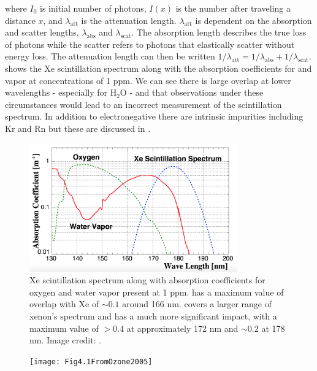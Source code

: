 where $I_0$ is initial number of photons, $I(x)$ is the number after traveling a distance $x$, and $\lambda_{\mathrm{att}}$ is the
attenuation length.  $\lambda_{\mathrm{att}}$ is dependent on the absorption and scatter lengths, $\lambda_{\mathrm{abs}}$ and
$\lambda_{\mathrm{scat}}$.  The absorption length describes the true loss of photons while the scatter refers to photons that elastically
scatter without energy loss.  The attenuation length can then be written
$1 / \lambda_{\mathrm{att}} = 1 / \lambda_{\mathrm{abs}} + 1 / \lambda_{\mathrm{scat}}$.   shows
the Xe scintillation spectrum along with the absorption coefficients for \otwo and \htwoo vapor at concentrations of 1 ppm.  We can see
there is large overlap at lower wavelengths - especially for H$_2$O - and that observations under these circumstances would lead to an
incorrect measurement of the scintillation spectrum.  In addition to electronegative there are intrinsic
impurities including Kr and Rn but these are discussed in .

\begin{figure}
\centering
\includegraphics[width=0.8\textwidth]{AbsorptionSpectra}
\caption{Xe scintillation spectrum along with absorption coefficients for oxygen and water vapor present at 1 ppm.  \otwo has a maximum
value of overlap
with Xe of ${\sim} 0.1$ around 166 nm.  \htwoo covers a larger range of xenon's spectrum and has a much more significant impact, with a
maximum value of $> 0.4$ at approximately 172 nm and ${\sim} 0.2$ at 178 nm.  Image credit: .}
\label{fig:xenon1t_pur_absorption_spectra}
\end{figure}

\begin{figure}
\centering
\texttt{[image: Fig4.1FromOzone2005]}
\label{fig:xenon1t_pur_absorp_dist}
\end{figure}


